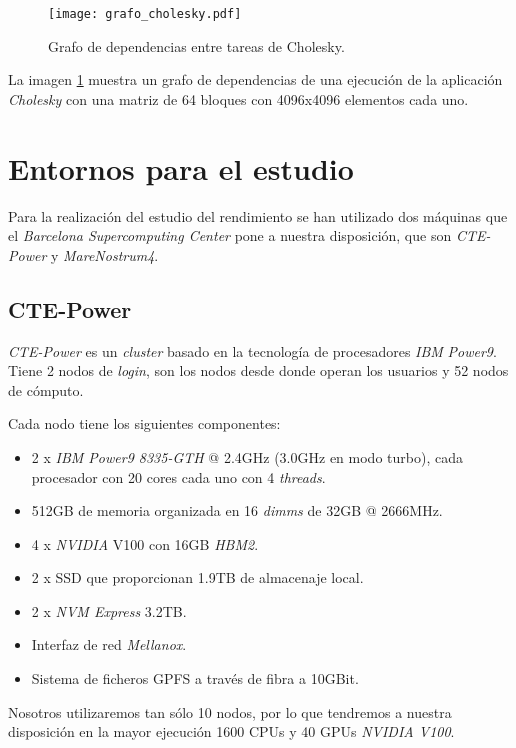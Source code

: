 \begin{figure}[h]
	\centering 
	\caption{Grafo de dependencias entre tareas de Cholesky.}
	\texttt{[image: grafo\_cholesky.pdf]}
	\label{fig:grafocholesky}
\end{figure}

La imagen \ref{fig:grafocholesky} muestra un grafo de dependencias de una ejecución de la aplicación \textit{Cholesky} con una matriz de 64 bloques con 4096x4096 elementos cada uno. 

\section{Entornos para el estudio}
\label{sec:entornos}

Para la realización del estudio del rendimiento se han utilizado dos máquinas que el \textit{Barcelona Supercomputing Center} pone a nuestra disposición, que son \textit{CTE-Power} y \textit{MareNostrum4}.

\subsection{CTE-Power}
\label{sec:power}

\textit{CTE-Power} es un \textit{cluster} basado en la tecnología de procesadores \textit{IBM} \textit{Power9}. Tiene 2 nodos de \textit{login}, son los nodos desde donde operan los usuarios y 52 nodos de cómputo. 
\par\smallskip
Cada nodo tiene los siguientes componentes:
\par\smallskip
\begin{itemize}
	\item 2 x \textit{IBM Power9 8335-GTH} @ 2.4GHz (3.0GHz en modo turbo), cada procesador con 20 cores cada uno con 4 \textit{threads}.
	\item 512GB de memoria organizada en 16 \textit{dimms} de 32GB @ 2666MHz.
	\item 4 x \textit{NVIDIA} V100 con 16GB \textit{HBM2}.
	\item 2 x SSD que proporcionan 1.9TB de almacenaje local.
	\item 2 x \textit{NVM Express} 3.2TB.
	\item Interfaz de red \textit{Mellanox}.
	\item Sistema de ficheros GPFS a través de fibra a 10GBit.
\end{itemize}

Nosotros utilizaremos tan sólo 10 nodos, por lo que tendremos a nuestra disposición en la mayor ejecución 1600 CPUs y 40 GPUs \textit{NVIDIA V100}. 

